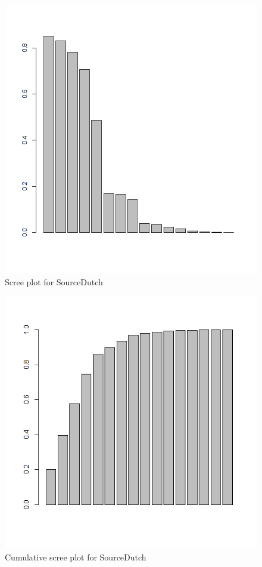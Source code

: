 \begin{figure}
\includegraphics[height=.3\textheight]{figures/Vandevoorde2-img20.png}
\caption{\label{fig:3:20}  Scree plot for SourceDutch}
\end{figure}

\begin{figure}
\includegraphics[height=.3\textheight]{figures/Vandevoorde2-img21.png}
\caption{\label{fig:3:21}  Cumulative scree plot for SourceDutch}
\end{figure}


